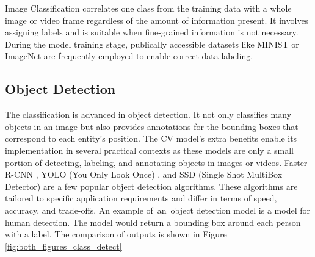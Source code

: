 Image Classification correlates one class from the training data with a whole image or video frame regardless of the amount of information present. It involves assigning labels and is suitable when fine-grained information is not necessary. During the model training stage, publically accessible datasets like MINIST or ImageNet \cite{datasetssss} are frequently employed to enable correct data labeling.

\subsection{Object Detection}
The classification is advanced in object detection. It not only classifies many objects in an image but also provides annotations for the bounding boxes that correspond to each entity's position. The CV model's extra benefits enable its implementation in several practical contexts as these models are only a small portion of detecting, labeling, and annotating objects in images or videos. Faster R-CNN \cite{girshick2014rich}, YOLO (You Only Look Once) \cite{redmon2016you}, and SSD (Single Shot MultiBox Detector)\cite{liu2016ssd} are a few popular object detection algorithms. These algorithms are tailored to specific application requirements and differ in terms of speed, accuracy, and trade-offs.  An example of~an~object detection model is a model for human detection. The model would return a bounding box around each person with a label. The comparison of outputs is shown in Figure \ref{fig:both_figures_class_detect}

